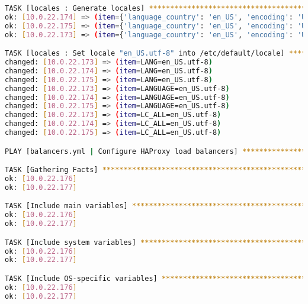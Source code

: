 \begin{flushleft}
\begin{lstlisting}[language=bash, caption=Deploy - Anhang - Deployt,captionpos=b,label={lst:deploy-appendix-deployt},breaklines=true]
TASK [locales : Generate locales] *********************************************************************************************************************************************************************************
ok: [10.0.22.174] => (item={'language_country': 'en_US', 'encoding': 'UTF-8'})
ok: [10.0.22.175] => (item={'language_country': 'en_US', 'encoding': 'UTF-8'})
ok: [10.0.22.173] => (item={'language_country': 'en_US', 'encoding': 'UTF-8'})

TASK [locales : Set locale "en_US.utf-8" into /etc/default/locale] ************************************************************************************************************************************************
changed: [10.0.22.173] => (item=LANG=en_US.utf-8)
changed: [10.0.22.174] => (item=LANG=en_US.utf-8)
changed: [10.0.22.175] => (item=LANG=en_US.utf-8)
changed: [10.0.22.173] => (item=LANGUAGE=en_US.utf-8)
changed: [10.0.22.174] => (item=LANGUAGE=en_US.utf-8)
changed: [10.0.22.175] => (item=LANGUAGE=en_US.utf-8)
changed: [10.0.22.173] => (item=LC_ALL=en_US.utf-8)
changed: [10.0.22.174] => (item=LC_ALL=en_US.utf-8)
changed: [10.0.22.175] => (item=LC_ALL=en_US.utf-8)

PLAY [balancers.yml | Configure HAProxy load balancers] ***********************************************************************************************************************************************************

TASK [Gathering Facts] ********************************************************************************************************************************************************************************************
ok: [10.0.22.176]
ok: [10.0.22.177]

TASK [Include main variables] *************************************************************************************************************************************************************************************
ok: [10.0.22.176]
ok: [10.0.22.177]

TASK [Include system variables] ***********************************************************************************************************************************************************************************
ok: [10.0.22.176]
ok: [10.0.22.177]

TASK [Include OS-specific variables] ******************************************************************************************************************************************************************************
ok: [10.0.22.176]
ok: [10.0.22.177]


\end{lstlisting}
\end{flushleft}
